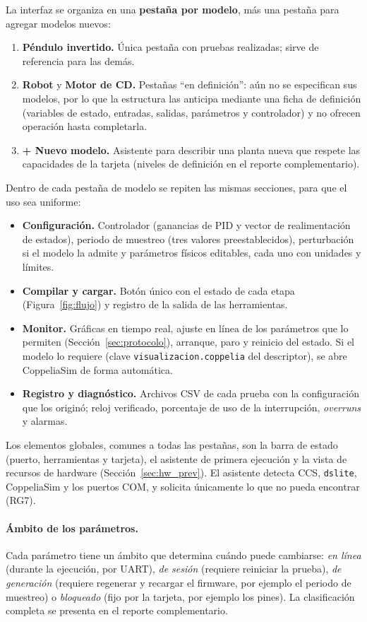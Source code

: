 \documentclass[12pt,letterpaper]{article}
\begin{document}
La interfaz se organiza en una \textbf{pestaña por modelo}, más una pestaña para agregar modelos nuevos:
\begin{enumerate}
    \item \textbf{Péndulo invertido.} Única pestaña con pruebas realizadas; sirve de referencia para las demás.
    \item \textbf{Robot} y \textbf{Motor de CD.} Pestañas ``en definición'': aún no se especifican sus modelos, por lo que la estructura las anticipa mediante una ficha de definición (variables de estado, entradas, salidas, parámetros y controlador) y no ofrecen operación hasta completarla.
    \item \textbf{+ Nuevo modelo.} Asistente para describir una planta nueva que respete las capacidades de la tarjeta (niveles de definición en el reporte complementario).
\end{enumerate}
Dentro de cada pestaña de modelo se repiten las mismas secciones, para que el uso sea uniforme:
\begin{itemize}
    \item \textbf{Configuración.} Controlador (ganancias de PID y vector de realimentación de estados), periodo de muestreo (tres valores preestablecidos), perturbación si el modelo la admite y parámetros físicos editables, cada uno con unidades y límites.
    \item \textbf{Compilar y cargar.} Botón único con el estado de cada etapa (Figura~\ref{fig:flujo}) y registro de la salida de las herramientas.
    \item \textbf{Monitor.} Gráficas en tiempo real, ajuste en línea de los parámetros que lo permiten (Sección~\ref{sec:protocolo}), arranque, paro y reinicio del estado. Si el modelo lo requiere (clave \texttt{visualizacion.coppelia} del descriptor), se abre CoppeliaSim de forma automática.
    \item \textbf{Registro y diagnóstico.} Archivos CSV de cada prueba con la configuración que los originó; reloj verificado, porcentaje de uso de la interrupción, \textit{overruns} y alarmas.
\end{itemize}
Los elementos globales, comunes a todas las pestañas, son la barra de estado (puerto, herramientas y tarjeta), el asistente de primera ejecución y la vista de recursos de hardware (Sección~\ref{sec:hw_prev}). El asistente detecta CCS, \texttt{dslite}, CoppeliaSim y los puertos COM, y solicita únicamente lo que no pueda encontrar (RG7).

\paragraph{Ámbito de los parámetros.} Cada parámetro tiene un ámbito que determina cuándo puede cambiarse: \emph{en línea} (durante la ejecución, por UART), \emph{de sesión} (requiere reiniciar la prueba), \emph{de generación} (requiere regenerar y recargar el firmware, por ejemplo el periodo de muestreo) o \emph{bloqueado} (fijo por la tarjeta, por ejemplo los pines). La clasificación completa se presenta en el reporte complementario.
\end{document}
